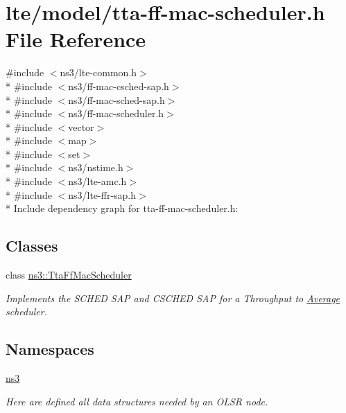 \hypertarget{lte_2model_2tta-ff-mac-scheduler_8h}{}\section{lte/model/tta-\/ff-\/mac-\/scheduler.h File Reference}
\label{lte_2model_2tta-ff-mac-scheduler_8h}
{\ttfamily \#include $<$ns3/lte-\/common.\+h$>$}\\*
{\ttfamily \#include $<$ns3/ff-\/mac-\/csched-\/sap.\+h$>$}\\*
{\ttfamily \#include $<$ns3/ff-\/mac-\/sched-\/sap.\+h$>$}\\*
{\ttfamily \#include $<$ns3/ff-\/mac-\/scheduler.\+h$>$}\\*
{\ttfamily \#include $<$vector$>$}\\*
{\ttfamily \#include $<$map$>$}\\*
{\ttfamily \#include $<$set$>$}\\*
{\ttfamily \#include $<$ns3/nstime.\+h$>$}\\*
{\ttfamily \#include $<$ns3/lte-\/amc.\+h$>$}\\*
{\ttfamily \#include $<$ns3/lte-\/ffr-\/sap.\+h$>$}\\*
Include dependency graph for tta-\/ff-\/mac-\/scheduler.h\+:
\subsection*{Classes}
\begin{DoxyCompactItemize}
\item 
class \hyperlink{classns3_1_1TtaFfMacScheduler}{ns3\+::\+Tta\+Ff\+Mac\+Scheduler}
\begin{DoxyCompactList}\small\item\em Implements the S\+C\+H\+ED S\+AP and C\+S\+C\+H\+ED S\+AP for a Throughput to \hyperlink{classns3_1_1Average}{Average} scheduler. \end{DoxyCompactList}\end{DoxyCompactItemize}
\subsection*{Namespaces}
\begin{DoxyCompactItemize}
\item 
 \hyperlink{namespacens3}{ns3}
\begin{DoxyCompactList}\small\item\em Here are defined all data structures needed by an O\+L\+SR node. \end{DoxyCompactList}\end{DoxyCompactItemize}
